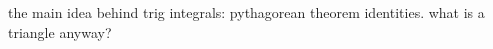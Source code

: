\documentclass{article}
\begin{document}
the main idea behind trig integrals: pythagorean theorem identities. what is a triangle anyway?
\end{document}

